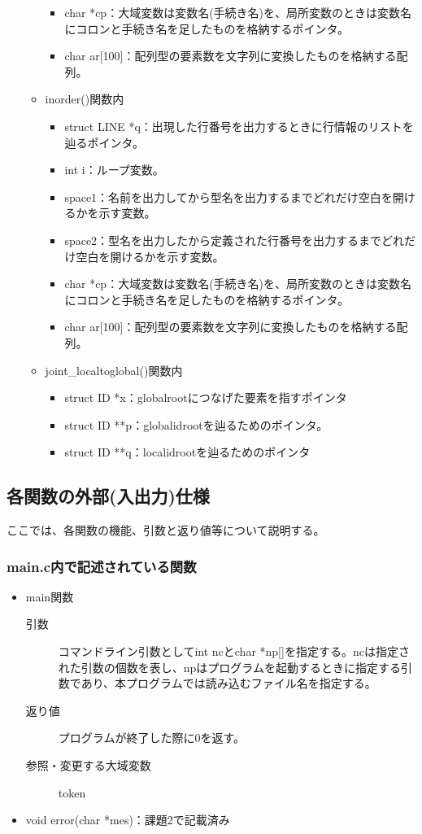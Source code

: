 \documentclass{jarticle}
\begin{document}
\begin{itemize}
\begin{itemize}
\begin{itemize}
      \item char *cp：大域変数は変数名(手続き名)を、局所変数のときは変数名にコロンと手続き名を足したものを格納するポインタ。
      \item char ar[100]：配列型の要素数を文字列に変換したものを格納する配列。
    \end{itemize}
    \item inorder()関数内
    \begin{itemize}
      \item struct LINE *q：出現した行番号を出力するときに行情報のリストを辿るポインタ。
      \item int i：ループ変数。
      \item space1：名前を出力してから型名を出力するまでどれだけ空白を開けるかを示す変数。
      \item space2：型名を出力したから定義された行番号を出力するまでどれだけ空白を開けるかを示す変数。
      \item char *cp：大域変数は変数名(手続き名)を、局所変数のときは変数名にコロンと手続き名を足したものを格納するポインタ。
      \item char ar[100]：配列型の要素数を文字列に変換したものを格納する配列。
    \end{itemize}
    \item joint\_localtoglobal()関数内
    \begin{itemize}
      \item struct ID *x：globalrootにつなげた要素を指すポインタ
      \item struct ID **p：globalidrootを辿るためのポインタ。
      \item struct ID **q：localidrootを辿るためのポインタ
    \end{itemize}
  \end{itemize}
\end{itemize}
\subsection{各関数の外部(入出力)仕様}
ここでは、各関数の機能、引数と返り値等について説明する。
\subsubsection{main.c内で記述されている関数}
\begin{itemize}
  \item main関数
  \begin{description}
\item[引数]コマンドライン引数としてint ncとchar
*np[]を指定する。ncは指定された引数の個数を表し、npはプログラムを起動するときに指定する引数であり、本プログラムでは読み込むファイル名を指定する。
\item[返り値]プログラムが終了した際に0を返す。
\item[参照・変更する大域変数]token
\end{description}
\item void error(char *mes)：課題2で記載済み
\end{itemize}
\end{document}
